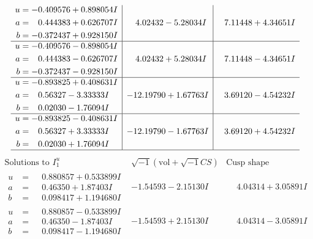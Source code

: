 \documentclass[1p]{elsarticle_modified}
\theoremstyle{definition}
\newcommand{\I}{\sqrt{-1}}
\begin{document}
$$\begin{array}{c|c|c}
\begin{aligned}
u &= -0.409576 + 0.898054 I \\
a &= \phantom{-}0.444383 + 0.626707 I \\
b &= -0.372437 + 0.928150 I\end{aligned}
 & \phantom{-}4.02432 - 5.28034 I & \phantom{-}7.11448 + 4.34651 I \\ \hline\begin{aligned}
u &= -0.409576 - 0.898054 I \\
a &= \phantom{-}0.444383 - 0.626707 I \\
b &= -0.372437 - 0.928150 I\end{aligned}
 & \phantom{-}4.02432 + 5.28034 I & \phantom{-}7.11448 - 4.34651 I \\ \hline\begin{aligned}
u &= -0.893825 + 0.408631 I \\
a &= \phantom{-}0.56327 - 3.33333 I \\
b &= \phantom{-}0.02030 - 1.76094 I\end{aligned}
 & -12.19790 + 1.67763 I & \phantom{-}3.69120 - 4.54232 I \\ \hline\begin{aligned}
u &= -0.893825 - 0.408631 I \\
a &= \phantom{-}0.56327 + 3.33333 I \\
b &= \phantom{-}0.02030 + 1.76094 I\end{aligned}
 & -12.19790 - 1.67763 I & \phantom{-}3.69120 + 4.54232 I\\
 \hline 
 \end{array}$$\newpage$$\begin{array}{c|c|c}  
\text{Solutions to }I^u_{1}& \I (\text{vol} + \sqrt{-1}CS) & \text{Cusp shape}\\
 \hline 
\begin{aligned}
u &= \phantom{-}0.880857 + 0.533899 I \\
a &= \phantom{-}0.46350 + 1.87403 I \\
b &= \phantom{-}0.098417 + 1.194680 I\end{aligned}
 & -1.54593 - 2.15130 I & \phantom{-}4.04314 + 3.05891 I \\ \hline\begin{aligned}
u &= \phantom{-}0.880857 - 0.533899 I \\
a &= \phantom{-}0.46350 - 1.87403 I \\
b &= \phantom{-}0.098417 - 1.194680 I\end{aligned}
 & -1.54593 + 2.15130 I & \phantom{-}4.04314 - 3.05891 I \\ \hline\begin{aligned}

\end{aligned}
\end{array}$$
\end{document}
